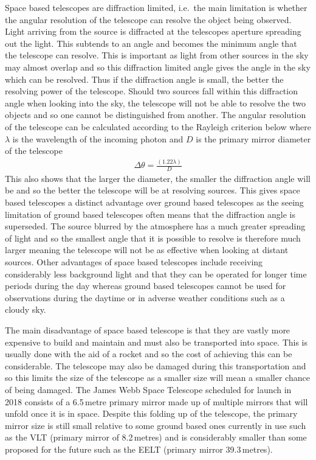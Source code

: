 	Space based telescopes are diffraction limited, i.e.\ the main limitation is whether the angular resolution of the telescope can resolve the object being observed. Light arriving from the source is diffracted at the telescopes aperture spreading out the light. This subtends to an angle and becomes the minimum angle that the telescope can resolve. This is important as light from other sources in the sky may almost overlap and so this diffraction limited angle gives the angle in the sky which can be resolved. Thus if the diffraction angle is small, the better the resolving power of the telescope. Should two sources fall within this diffraction angle when looking into the sky, the telescope will not be able to resolve the two objects and so one cannot be distinguished from another. The angular resolution of the telescope can be calculated according to the Rayleigh criterion below where $\lambda$ is the wavelength of the incoming photon and $D$ is the primary mirror diameter of the telescope
	\begin{align}
		\Delta\theta= \frac{(1.22 \lambda)}{D}
	\end{align}
	This also shows that the larger the diameter, the smaller the diffraction angle will be and so the better the telescope will be at resolving sources. This gives space based telescopes a distinct advantage over ground based telescopes as the seeing limitation of ground based telescopes often means that the diffraction angle is superseded. The source blurred by the atmosphere has a much greater spreading of light and so the smallest angle that it is possible to resolve is therefore much larger meaning the telescope will not be as effective when looking at distant sources. Other advantages of space based telescopes include receiving considerably less background light and that they can be operated for longer time periods during the day whereas ground based telescopes cannot be used for observations during the daytime or in adverse weather conditions such as a cloudy sky.

	The main disadvantage of space based telescope is that they are vastly more expensive to build and maintain and must also be transported into space. This is usually done with the aid of a rocket and so the cost of achieving this can be considerable. The telescope may also be damaged during this transportation and so this limits the size of the telescope as a smaller size will mean a smaller chance of being damaged. The James Webb Space Telescope scheduled for launch in 2018 consists of a 6.5\,metre primary mirror made up of multiple mirrors that will unfold once it is in space. Despite this folding up of the telescope, the primary mirror size is still small relative to some ground based ones currently in use such as the VLT (primary mirror of 8.2\,metres) and is considerably smaller than some proposed for the future such as the EELT (primary mirror 39.3\,metres).

